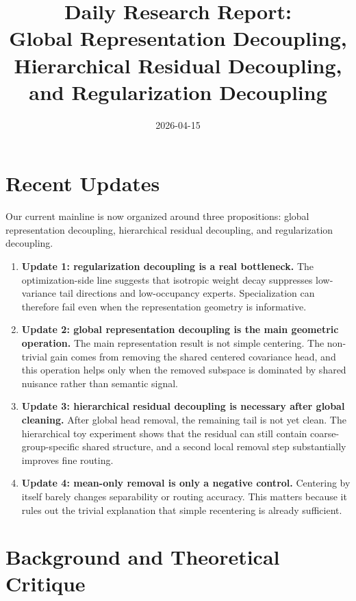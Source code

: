 \documentclass[11pt]{article}
\title{Daily Research Report:\\Global Representation Decoupling, Hierarchical Residual Decoupling, and Regularization Decoupling}
\author{}
\date{2026-04-15}
\begin{document}
\maketitle

\section{Recent Updates}

Our current mainline is now organized around three propositions: global representation decoupling, hierarchical residual decoupling, and regularization decoupling.

\begin{enumerate}[leftmargin=1.5em]
    \item \textbf{Update 1: regularization decoupling is a real bottleneck.}  
    The optimization-side line suggests that isotropic weight decay suppresses low-variance tail directions and low-occupancy experts. Specialization can therefore fail even when the representation geometry is informative.

    \item \textbf{Update 2: global representation decoupling is the main geometric operation.}  
    The main representation result is not simple centering. The non-trivial gain comes from removing the shared centered covariance head, and this operation helps only when the removed subspace is dominated by shared nuisance rather than semantic signal.

    \item \textbf{Update 3: hierarchical residual decoupling is necessary after global cleaning.}  
    After global head removal, the remaining tail is not yet clean. The hierarchical toy experiment shows that the residual can still contain coarse-group-specific shared structure, and a second local removal step substantially improves fine routing.

    \item \textbf{Update 4: mean-only removal is only a negative control.}  
    Centering by itself barely changes separability or routing accuracy. This matters because it rules out the trivial explanation that simple recentering is already sufficient.
\end{enumerate}

\section{Background and Theoretical Critique}
\end{document}

